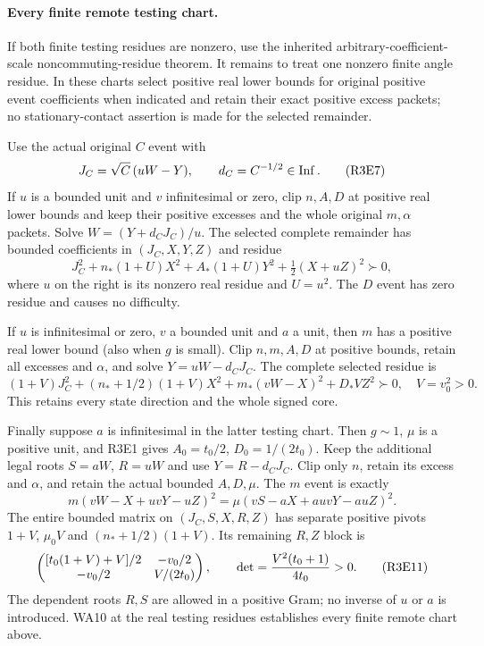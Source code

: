 \paragraph{Every finite remote testing chart.}
If both finite testing residues are nonzero, use the inherited
arbitrary-coefficient-scale noncommuting-residue theorem. It remains
to treat one nonzero finite angle residue. In these charts select
positive real lower bounds for original positive event coefficients
when indicated and retain their exact positive excess packets;
no stationary-contact assertion is made for the selected remainder.

Use the actual original $C$ event with
\[
       J_C=\sqrt C\,(uW-Y),\qquad d_C=C^{-1/2}\in\operatorname{Inf}.
                                                               \tag{R3E7}
\]
If $u$ is a bounded unit and $v$ infinitesimal or zero, clip $n,A,D$
at positive real lower bounds and keep their positive excesses and
the whole original $m,\alpha$ packets. Solve
$W=(Y+d_CJ_C)/u$. The selected complete remainder has bounded
coefficients in $(J_C,X,Y,Z)$ and residue
\[
 J_C^2+n_*(1+U)X^2+A_*(1+U)Y^2
                         +\tfrac12(X+uZ)^2\succ0,               \tag{R3E8}
\]
where $u$ on the right is its nonzero real residue and $U=u^2$.
The $D$ event has zero residue and causes no difficulty.

If $u$ is infinitesimal or zero, $v$ a bounded unit and $a$ a unit,
then $m$ has a positive real lower bound (also when $g$ is small).
Clip $n,m,A,D$ at positive bounds, retain all excesses and $\alpha$,
and solve $Y=uW-d_CJ_C$. The complete selected residue is
\[
 (1+V)J_C^2+(n_*+1/2)(1+V)X^2
       +m_*(vW-X)^2+D_*VZ^2\succ0,\quad V=v_0^2>0.              \tag{R3E9}
\]
This retains every state direction and the whole signed core.

Finally suppose $a$ is infinitesimal in the latter testing chart.
Then $g\sim1$, $\mu$ is a positive unit, and R3E1 gives
$A_0=t_0/2$, $D_0=1/(2t_0)$. Keep the additional legal roots
$S=aW$, $R=uW$ and use $Y=R-d_CJ_C$. Clip only $n$, retain its
excess and $\alpha$, and retain the actual bounded $A,D,\mu$.
The $m$ event is exactly
\[
 m(vW-X+uvY-uZ)^2
       =\mu(vS-aX+auvY-auZ)^2.                    \tag{R3E10}
\]
The entire bounded matrix on $(J_C,S,X,R,Z)$ has separate
positive pivots $1+V$, $\mu_0V$ and $(n_*+1/2)(1+V)$.
Its remaining $R,Z$ block is
\[
 \begin{pmatrix}
 [t_0(1+V)+V]/2&-v_0/2\\
 -v_0/2&V/(2t_0)
 \end{pmatrix},\qquad
 \det={V^2(t_0+1)\over4t_0}>0.                    \tag{R3E11}
\]
The dependent roots $R,S$ are allowed in a positive Gram; no inverse
of $u$ or $a$ is introduced. WA10 at the real testing residues
establishes every finite remote chart above.

